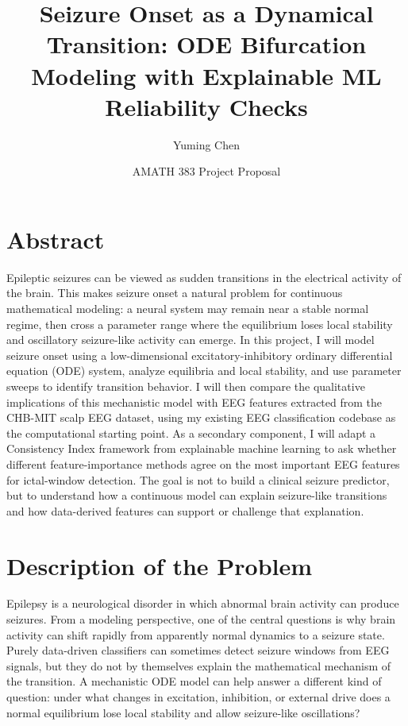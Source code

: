 \documentclass[11pt]{article}
\title{\textbf{Seizure Onset as a Dynamical Transition: ODE Bifurcation Modeling with Explainable ML Reliability Checks}}
\author{Yuming Chen}
\date{AMATH 383 Project Proposal}
\begin{document}
\maketitle

\section*{Abstract}

Epileptic seizures can be viewed as sudden transitions in the electrical activity of the brain. This makes seizure onset a natural problem for continuous mathematical modeling: a neural system may remain near a stable normal regime, then cross a parameter range where the equilibrium loses local stability and oscillatory seizure-like activity can emerge. In this project, I will model seizure onset using a low-dimensional excitatory-inhibitory ordinary differential equation (ODE) system, analyze equilibria and local stability, and use parameter sweeps to identify transition behavior. I will then compare the qualitative implications of this mechanistic model with EEG features extracted from the CHB-MIT scalp EEG dataset, using my existing EEG classification codebase as the computational starting point. As a secondary component, I will adapt a Consistency Index framework from explainable machine learning to ask whether different feature-importance methods agree on the most important EEG features for ictal-window detection. The goal is not to build a clinical seizure predictor, but to understand how a continuous model can explain seizure-like transitions and how data-derived features can support or challenge that explanation.

\section*{Description of the Problem}

Epilepsy is a neurological disorder in which abnormal brain activity can produce seizures. From a modeling perspective, one of the central questions is why brain activity can shift rapidly from apparently normal dynamics to a seizure state. Purely data-driven classifiers can sometimes detect seizure windows from EEG signals, but they do not by themselves explain the mathematical mechanism of the transition. A mechanistic ODE model can help answer a different kind of question: under what changes in excitation, inhibition, or external drive does a normal equilibrium lose local stability and allow seizure-like oscillations?
\end{document}
